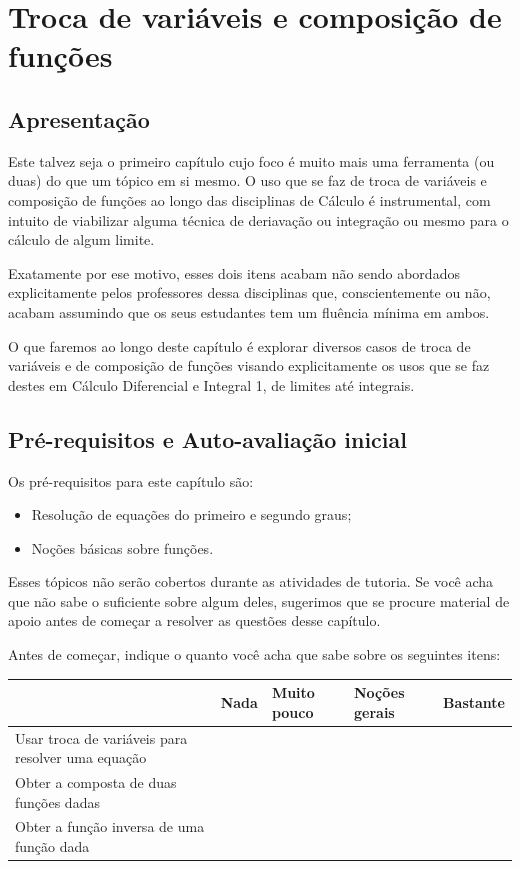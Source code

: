 \documentclass[main_estudante.tex]{subfiles}
\begin{document}
\chapter{Troca de variáveis e composição de funções}

\section{Apresentação}

Este talvez seja o primeiro capítulo cujo foco é muito mais uma ferramenta (ou duas) do que um tópico em si mesmo. O uso que se faz de troca de variáveis e composição de funções ao longo das disciplinas de Cálculo é instrumental, com intuito de viabilizar alguma técnica de deriavação ou integração ou mesmo para o cálculo de algum limite.

Exatamente por ese motivo, esses dois itens acabam não sendo abordados explicitamente pelos professores dessa disciplinas que, conscientemente ou não, acabam assumindo que os seus estudantes tem um fluência mínima em ambos.

O que faremos ao longo deste capítulo é explorar diversos casos de troca de variáveis e de composição de funções visando explicitamente os usos que se faz destes em Cálculo Diferencial e Integral 1, de limites até integrais.

\newpage

\section{Pré-requisitos e Auto-avaliação inicial}

Os pré-requisitos para este capítulo são:
\begin{itemize}
 \item Resolução de equações do primeiro e segundo graus;
 \item Noções básicas sobre funções.
\end{itemize}

Esses tópicos não serão cobertos durante as atividades de tutoria. Se você acha que não sabe o suficiente sobre algum deles, sugerimos que se procure material de apoio antes de começar a resolver as questões desse capítulo.

Antes de começar, indique o quanto você acha que sabe sobre os seguintes itens:

\begin{center}
 \begin{tabular}{|p{35mm}||p{15mm}|p{15mm}|p{15mm}|p{15mm}|} 
 \hline
   & Nada & Muito pouco & Noções gerais & Bastante\\
 \hline
 Usar troca de variáveis para resolver uma equação &  &  &  &  \\ 
 \hline
 Obter a composta de duas funções dadas &  &  &  &  \\
 \hline
 Obter a função inversa de uma função dada &  &  &  &  \\
 \hline
\end{tabular}
\end{center}
\end{document}

